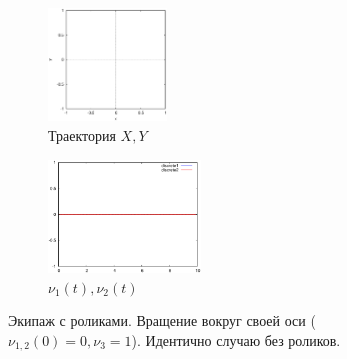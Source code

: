 \begin{figure}
    \centering
    \begin{subfigure}[t]{0.3\textwidth}
        \centering
        \includegraphics[width=\linewidth, height=30mm]{pic/_sol__0_0_1__0__10__1e2_trajectory}
        \caption{Траектория $X, Y$}
        \label{fig:_sol__0_0_1__0__10__1e2_trajectory}
    \end{subfigure}
    \begin{subfigure}[t]{0.3\textwidth}
        \centering
        \includegraphics[width=\linewidth, height=30mm]{pic/_sol__0_0_1__0__10__1e2_nu12}
        \caption{$\nu_1(t), \nu_2(t)$}
        \label{fig:_sol__0_0_1__0__10__1e2_nu12}    
    \end{subfigure}
    
    
    \caption{Экипаж с роликами. Вращение вокруг своей оси ($\nu_{1,2}(0) = 0, \nu_3 = 1$). Идентично случаю без роликов.}
    \label{fig:selfrot}
\end{figure}
